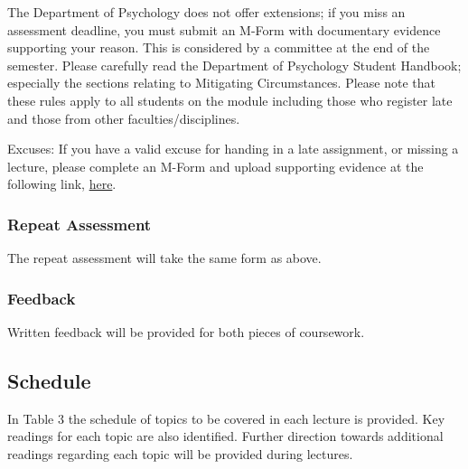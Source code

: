 \documentclass[
  x11names]{article}
\begin{document}
The Department of Psychology does not offer extensions; if you miss an
assessment deadline, you must submit an M-Form with documentary evidence
supporting your reason. This is considered by a committee at the end of
the semester. Please carefully read the Department of Psychology Student
Handbook; especially the sections relating to Mitigating Circumstances.
Please note that these rules apply to all students on the module
including those who register late and those from other
faculties/disciplines.

Excuses: If you have a valid excuse for handing in a late assignment, or
missing a lecture, please complete an M-Form and upload supporting
evidence at the following link,
\color{blue}\href{https://workflow.ul.ie/MForms/MForms/}{here}\color{black}.

\subsubsection{Repeat Assessment}\label{repeat-assessment}

The repeat assessment will take the same form as above.

\subsubsection{Feedback}\label{feedback}

Written feedback will be provided for both pieces of coursework.

\pagebreak

\subsection{Schedule}\label{schedule}

In Table 3 the schedule of topics to be covered in each lecture is
provided. Key readings for each topic are also identified. Further
direction towards additional readings regarding each topic will be
provided during lectures.
\end{document}
